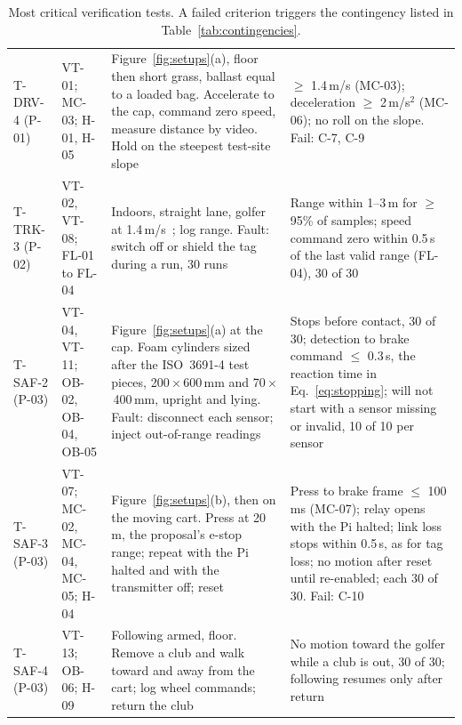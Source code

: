 \begin{table}[!htbp]
\centering
\caption{Most critical verification tests. A failed criterion triggers the contingency listed in Table~\ref{tab:contingencies}.}
\label{tab:tests-body}
\footnotesize\renewcommand{\arraystretch}{1.0}
\begin{tabularx}{\linewidth}{@{}L{0.56in} L{0.72in} Y Y@{}}
\toprule
{} &  &  &  \\
\midrule
\mbox{T-DRV-4} (P-01) & VT-01; MC-03; H-01, H-05 & Figure~\ref{fig:setups}(a), floor then short grass, ballast equal to a loaded bag. Accelerate to the cap, command zero speed, measure distance by video. Hold on the steepest test-site slope & $\ge$ 1.4\,m/s (MC-03); deceleration $\ge$ 2\,m/s$^2$ (MC-06); no roll on the slope. Fail: C-7, C-9 \\
\addlinespace[2pt]
\mbox{T-TRK-3} (P-02) & VT-02, VT-08; FL-01 to FL-04 & Indoors, straight lane, golfer at 1.4\,m/s~\cite{bohannon2011walking}; log range. Fault: switch off or shield the tag during a run, 30 runs & Range within 1--3\,m for $\ge$ 95\% of samples; speed command zero within 0.5\,s of the last valid range (FL-04), 30 of 30 \\
\addlinespace[2pt]
\mbox{T-SAF-2} (P-03) & VT-04, VT-11; OB-02, OB-04, OB-05 & Figure~\ref{fig:setups}(a) at the cap. Foam cylinders sized after the ISO~3691-4 test pieces, 200\,$\times$\,600\,mm and 70\,$\times$\,400\,mm, upright and lying. Fault: disconnect each sensor; inject out-of-range readings & Stops before contact, 30 of 30; detection to brake command $\le$ 0.3\,s, the reaction time in Eq.~\eqref{eq:stopping}; will not start with a sensor missing or invalid, 10 of 10 per sensor \\
\addlinespace[2pt]
\mbox{T-SAF-3} (P-03) & VT-07; MC-02, MC-04, MC-05; H-04 & Figure~\ref{fig:setups}(b), then on the moving cart. Press at 20\,m, the proposal's e-stop range; repeat with the Pi halted and with the transmitter off; reset & Press to brake frame $\le$ 100\,ms (MC-07); relay opens with the Pi halted; link loss stops within 0.5\,s, as for tag loss; no motion after reset until re-enabled; each 30 of 30. Fail: C-10 \\
\addlinespace[2pt]
\mbox{T-SAF-4} (P-03) & VT-13; OB-06; H-09 & Following armed, floor. Remove a club and walk toward and away from the cart; log wheel commands; return the club & No motion toward the golfer while a club is out, 30 of 30; following resumes only after return \\
\bottomrule
\end{tabularx}
\end{table}

